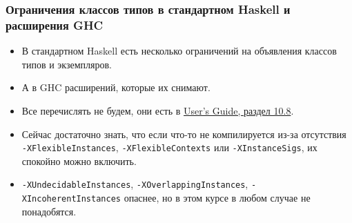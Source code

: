 \documentclass[10pt]{beamer}
\begin{document}
\begin{frame}[fragile]
\frametitle{Ограничения классов типов в стандартном Haskell и расширения GHC}
\begin{itemize}
    \item В стандартном Haskell есть несколько ограничений на объявления классов типов и экземпляров.
    \item А в GHC расширений, которые их снимают. 
    \item Все перечислять не будем, они есть в  \href{http://downloads.haskell.org/~ghc/latest/docs/html/users_guide/glasgow_exts.html#class-declarations}{User's Guide, раздел 10.8}.
    \item Сейчас достаточно знать, что если что-то не компилируется из-за отсутствия \lstinline|-XFlexibleInstances|, \lstinline|-XFlexibleContexts| или \lstinline|-XInstanceSigs|, их спокойно можно включить.
    \item \lstinline|-XUndecidableInstances|, \lstinline|-XOverlappingInstances|, \lstinline|-XIncoherentInstances| опаснее, но в этом курсе в любом случае не понадобятся.
\end{itemize}
\end{frame}

%
    
\end{document}
